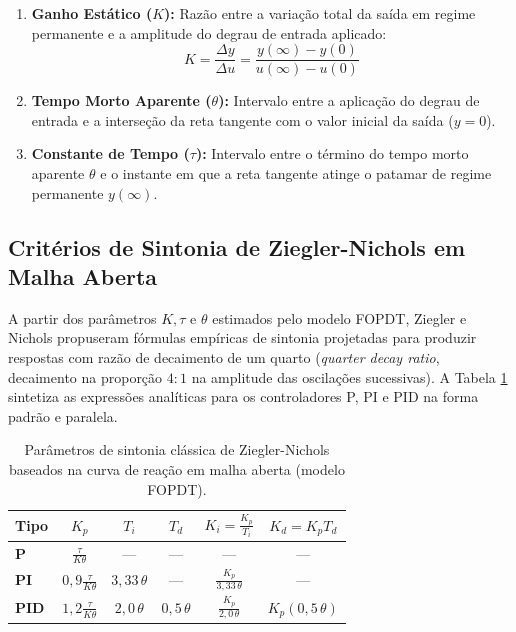 \begin{enumerate}
    \item \textbf{Ganho Estático ($K$):} Razão entre a variação total da saída em regime permanente e a amplitude do degrau de entrada aplicado:
    \begin{equation}
        K = \frac{\Delta y}{\Delta u} = \frac{y(\infty) - y(0)}{u(\infty) - u(0)}
        \label{eq:ganho_estatico}
    \end{equation}
    \item \textbf{Tempo Morto Aparente ($\theta$):} Intervalo entre a aplicação do degrau de entrada e a interseção da reta tangente com o valor inicial da saída ($y = 0$).
    \item \textbf{Constante de Tempo ($\tau$):} Intervalo entre o término do tempo morto aparente $\theta$ e o instante em que a reta tangente atinge o patamar de regime permanente $y(\infty)$.
\end{enumerate}

\subsection{Critérios de Sintonia de Ziegler-Nichols em Malha Aberta}
\label{subsec:zn_malha_aberta}

A partir dos parâmetros $K, \tau$ e $\theta$ estimados pelo modelo FOPDT, Ziegler e Nichols \cite{ziegler1942} propuseram fórmulas empíricas de sintonia projetadas para produzir respostas com razão de decaimento de um quarto (\textit{quarter decay ratio}, decaimento na proporção $4:1$ na amplitude das oscilações sucessivas). A Tabela \ref{tab:ziegler_nichols} sintetiza as expressões analíticas para os controladores P, PI e PID na forma padrão e paralela.

\begin{table}[htbp]
    \centering
    \caption{Parâmetros de sintonia clássica de Ziegler-Nichols baseados na curva de reação em malha aberta (modelo FOPDT).}
    \label{tab:ziegler_nichols}
    \begin{tabular}{l|c|c|c|c|c}
        \hline
        \textbf{Tipo} & $K_p$ & $T_i$ & $T_d$ & $K_i = \frac{K_p}{T_i}$ & $K_d = K_p T_d$ \\
        \hline
        \textbf{P}   & $\frac{\tau}{K \theta}$ & --- & --- & --- & --- \\
        \textbf{PI}  & $0{,}9 \frac{\tau}{K \theta}$ & $3{,}33 \, \theta$ & --- & $\frac{K_p}{3{,}33 \, \theta}$ & --- \\
        \textbf{PID} & $1{,}2 \frac{\tau}{K \theta}$ & $2{,}0 \, \theta$ & $0{,}5 \, \theta$ & $\frac{K_p}{2{,}0 \, \theta}$ & $K_p (0{,}5 \, \theta)$ \\
        \hline
    \end{tabular}
    \vspace{0.1cm}
\end{table}

